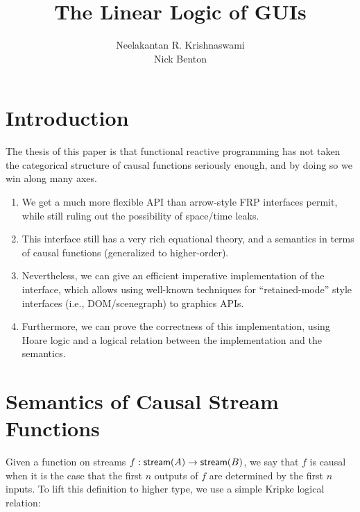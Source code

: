 \documentclass{article}
\title{The Linear Logic of GUIs}
\author{Neelakantan R. Krishnaswami \\ Nick Benton}
\newcommand{\Approx}[2][n]{\left\lfloor{#2}\right\rfloor^{#1}}
\newcommand{\lolli}{\multimap}
\begin{document}
\section{Introduction}

The thesis of this paper is that functional reactive programming has not taken the 
categorical structure of causal functions seriously enough, and by doing so we win 
along many axes. 

\begin{enumerate}
\item We get a much more flexible API than arrow-style FRP interfaces
  permit, while still ruling out the possibility of space/time leaks.

\item This interface still has a very rich equational theory, and a
  semantics in terms of causal functions (generalized to higher-order). 

\item Nevertheless, we can give an efficient imperative implementation of the 
  interface, which allows using well-known techniques for ``retained-mode''
  style interfaces (i.e., DOM/scenegraph) to graphics APIs.  

\item Furthermore, we can prove the correctness of this implementation, using
  Hoare logic and a logical relation between the implementation and the semantics. 
\end{enumerate}

\section{Semantics of Causal Stream Functions}

Given a function on streams $f : \stream{A} \to \stream{B}$, we say
that $f$ is causal when it is the case that the first $n$ outputs of
$f$ are determined by the first $n$ inputs. To lift this definition to
higher type, we use a simple Kripke logical relation:

\begin{mathpar}
\end{mathpar}
\end{document}
